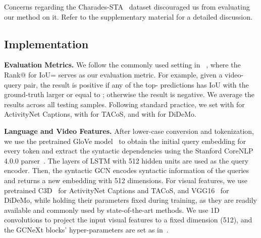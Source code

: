 \documentclass[10pt,twocolumn,letterpaper]{article}
\begin{document}
Concerns regarding the Charades-STA~\cite{Gao_2017_ICCV} dataset discouraged us from evaluating our method on it. Refer to the supplementary material for a detailed discussion. 



\subsection{Implementation}\label{subsec: Impl}
\noindent\textbf{Evaluation Metrics.}
We follow the commonly used setting in ~\cite{gao2017tall}, where the Rank@ for IoU= serves as our evaluation metric. 
For example, given a video-query pair, the result is positive if any of the top- predictions has IoU with the ground-truth larger or equal to ; otherwise the result is negative. We average the results across all testing samples. Following standard practice, we set  with  for ActivityNet Captions,
 with  for TACoS,  and  with  for DiDeMo. 



\noindent\textbf{Language and Video Features.}
After lower-case conversion and tokenization, we use the pretrained GloVe model~\cite{pennington2014glove} to obtain the initial query embedding for every token and extract the syntactic dependencies using the Stanford CoreNLP 4.0.0 parser~\cite{manning2014stanford}. The  layers 
of LSTM with 512 hidden units are used as the query encoder.  Then, the syntactic GCN encodes syntactic information of the queries and returns a new embedding with 512 dimensions. For visual features, we use pretrained C3D~\cite{tran2015learning} for ActivityNet Captions and TACoS, and VGG16~\cite{simonyan2014very} for DiDeMo,  while holding their parameters fixed during training, as they are readily available and commonly used by state-of-the-art methods. We use 1D convolutions to project the input visual features to a fixed dimension (512), and the GCNeXt blocks' hyper-parameters are set as in~\cite{Xu_2020_CVPR}. 
\end{document}
